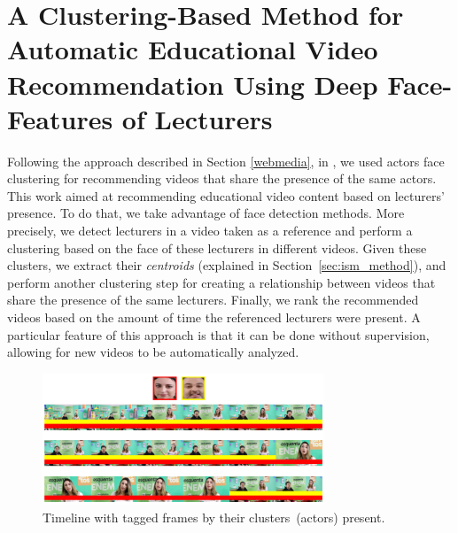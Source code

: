 \section{A Clustering-Based Method for Automatic Educational Video Recommendation Using Deep Face-Features of Lecturers}

Following the approach described in Section \ref{webmedia}, in \cite{mendes2020ISM}, we used actors face clustering for recommending videos that share the presence of the same actors. 
This work aimed at recommending educational video content based on lecturers' presence.
To do that, we take advantage of face detection methods.
More precisely, we detect lecturers in a video taken as a reference and perform a clustering based on the face of these lecturers in different videos.
Given these clusters, we extract their \textit{centroids} (explained in Section~\ref{sec:ism_method}), and perform another clustering step for creating a relationship between videos that share the presence of the same lecturers.
Finally, we rank the recommended videos based on the amount of time the referenced lecturers were present.
A particular feature of this approach is that it can be done without supervision, allowing for new videos to be automatically analyzed.


\begin{figure}[!ht]
    \centering
    \includegraphics[width=0.75\textwidth]{img/ism/educational_timeline2.png}
    \caption{Timeline with tagged frames by their clusters~(actors) present.}
    \label{fig:timeline2}
\end{figure}





